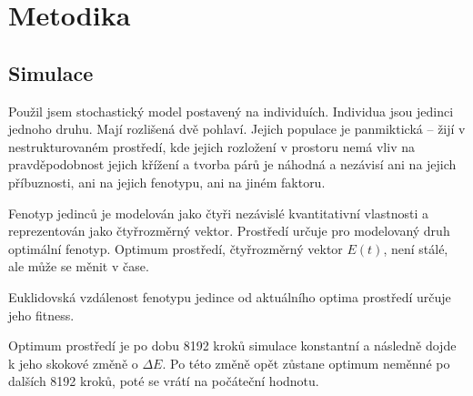 \chapter{Metodika}



\section{Simulace}

Použil jsem stochastický model postavený na individuích. Individua jsou jedinci jednoho druhu. Mají rozlišená
dvě pohlaví. Jejich populace je panmiktická -- žijí v nestrukturovaném prostředí, kde jejich rozložení v prostoru nemá
vliv na pravděpodobnost jejich křížení a tvorba párů je náhodná a nezávisí ani na jejich příbuznosti, ani na jejich
fenotypu, ani na jiném faktoru.

Fenotyp jedinců je modelován jako čtyři nezávislé kvantitativní vlastnosti a reprezentován jako čtyřrozměrný vektor.
Prostředí určuje pro modelovaný druh optimální fenotyp. Optimum prostředí, čtyřrozměrný vektor $E(t)$, není stálé,
ale může se měnit v čase.

Euklidovská vzdálenost fenotypu jedince od aktuálního optima prostředí určuje jeho fitness.

Optimum prostředí je po dobu 8192 kroků simulace konstantní a následně dojde k jeho skokové změně o
$\Delta{}E$. Po této změně opět zůstane optimum neměnné po dalších 8192 kroků, poté se vrátí na počáteční hodnotu.

